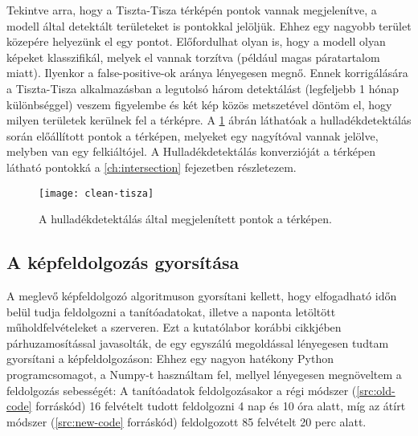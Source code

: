 Tekintve arra, hogy a Tiszta-Tisza térképén pontok vannak megjelenítve, a modell által detektált területeket is pontokkal jelöljük. Ehhez egy nagyobb terület közepére helyezünk el egy pontot. Előfordulhat olyan is, hogy a modell olyan képeket klasszifikál, melyek el vannak torzítva (például magas páratartalom miatt). Ilyenkor a false-positive-ok aránya lényegesen megnő. Ennek korrigálására a Tiszta-Tisza alkalmazásban a legutolsó három detektálást (legfeljebb 1 hónap különbséggel) veszem figyelembe és két kép közös metszetével döntöm el, hogy milyen területek kerülnek fel a térképre. A \ref{fig:clean-tisza} ábrán láthatóak a hulladékdetektálás során előállított pontok a térképen, melyeket egy nagyítóval vannak jelölve, melyben van egy felkiáltójel. A Hulladékdetektálás konverzióját a térképen látható pontokká a \ref{ch:intersection} fejezetben részletezem.

\begin{figure}[H]
	\centering
	\texttt{[image: clean-tisza]}
	\caption{A hulladékdetektálás által megjelenített pontok a térképen.}
    \label{fig:clean-tisza}
\end{figure}

\subsection{A képfeldolgozás gyorsítása}
A meglevő képfeldolgozó algoritmuson gyorsítani kellett, hogy elfogadható időn belül tudja feldolgozni a tanítóadatokat, illetve a naponta letöltött műholdfelvételeket a szerveren. Ezt a kutatólabor korábbi cikkjében párhuzamosítással javasolták, de egy egyszálú megoldással lényegesen tudtam gyorsítani a képfeldolgozáson: Ehhez egy nagyon hatékony Python programcsomagot, a Numpy-t \cite{harris2020array} használtam fel, mellyel lényegesen megnöveltem a feldolgozás sebességét: A tanítóadatok feldolgozásakor a régi módszer (\ref{src:old-code} forráskód) 16 felvételt tudott feldolgozni 4 nap és 10 óra alatt, míg az átírt módszer (\ref{src:new-code} forráskód) feldolgozott 85 felvételt 20 perc alatt.

